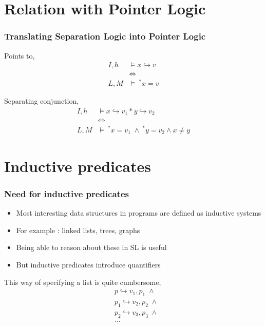 \documentclass{beamer}
\begin{document}
\section{Relation with Pointer Logic}

\begin{frame}
\frametitle{Translating Separation Logic into Pointer Logic}
Points to,
\begin{align*}
    I,h & \models x \hookrightarrow v \\
    & \Longleftrightarrow \\
    L,M & \models \ ^*x = v
\end{align*}

Separating conjunction,
\begin{align*}
    I,h & \models x \hookrightarrow v_1 * y \hookrightarrow v_2 \\
    & \Longleftrightarrow \\
    L,M & \models \ ^*x = v_1 \; \land \ ^*y = v_2 \land x \neq y
\end{align*}
\end{frame}

\section{Inductive predicates}
\begin{frame}
\frametitle{Need for inductive predicates}
\begin{itemize}
    \item Most interesting data structures in programs are defined as inductive systems
    \item For example : linked lists, trees, graphs
    \item Being able to reason about these in SL is useful
    \item But inductive predicates introduce quantifiers
\end{itemize}
	\vspace{0.5cm}
This way of specifying a list is quite cumbersome,
    \begin{align*}
        & p \hookrightarrow v_1,p_1 \; \land \\
        & p_1 \hookrightarrow v_2, p_2 \; \land \\
        & p_2 \hookrightarrow v_3, p_3 \; \land \\
        & \ldots
    \end{align*}
\end{frame}
\end{document}
